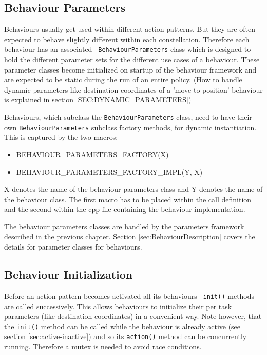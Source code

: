\subsection{Behaviour Parameters}

Behaviours usually get used within different action patterns. But they
are often expected to behave slightly different within each
constellation. Therefore each behaviour has an associated {\tt
  BehaviourParameters} class which is designed to hold the different
parameter sets for the different use cases of a behaviour. These
parameter classes become initialized on startup of the behaviour
framework and are expected to be static during the run of an entire
policy. (How to handle dynamic parameters like destination coordinates
of a 'move to position' behaviour is explained in section
\ref{SEC:DYNAMIC_PARAMETERS})

Behaviours, which subclass the {\tt BehaviourParameters} class,
need to have their own {\tt BehaviourParameters}
subclass factory methods, for dynamic instantiation. This is captured by
the two macros:
\begin{itemize}
\item BEHAVIOUR\_PARAMETERS\_FACTORY(X)
\item BEHAVIOUR\_PARAMETERS\_FACTORY\_IMPL(Y, X)
\end{itemize}
X denotes the name of the behaviour parameters class and Y denotes the
name of the behaviour class. The first macro has to be placed within
the call definition and the second within the cpp-file containing the
behaviour implementation.

The behaviour parameters classes are handled by the parameters
framework described in the previous chapter. Section
\ref{sec:BehaviourDescription} covers the details for parameter
classes for behaviours.

\subsection{Behaviour Initialization}
\label{sec:init}

Before an action pattern becomes activated all its behaviours {\tt
  init()} methods are called successively. This allows behaviours to
initialize their per task parameters (like destination coordinates) in
a convenient way. Note however, that the {\tt init()} method can be
called while the behaviour is already active (see section
\ref{sec:active-inactive}) and so its {\tt action()} method can be
concurrently running. Therefore a mutex is needed to avoid race
conditions.


